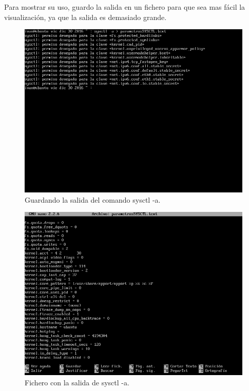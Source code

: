 Para mostrar su uso, guardo la salida en un fichero para que sea mas fácil la visualización, ya que la salida es demasiado grande.

\begin{figure}[H]
	\begin{center}
		\includegraphics[width=15cm]{Imagenes/Uso_sysctl_a}
		\caption{Guardando la salida del comando sysctl -a.}
		\label{fig:4}
	\end{center}
\end{figure}

\begin{figure}[H]
	\begin{center}
		\includegraphics[width=15cm]{Imagenes/Mostrando_salida_sysctl}
		\caption{Fichero con la salida de sysctl -a.}
		\label{fig:5}
	\end{center}
\end{figure}

